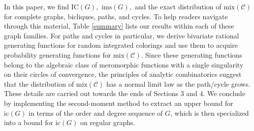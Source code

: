 \documentclass[11pt, reqno]{amsart}
\theoremstyle{definition}
\begin{document}
In this paper, we find $\text{IC}(G),$ $\text{ims}(G),$ and the exact distribution of $\text{mix}(\mathcal{C})$ for complete graphs, bicliques, paths, and cycles. To help readers navigate through this material, Table \ref{summary} lists our results within each of these graph families. For paths and cycles in particular, we derive bivariate rational generating functions for random integrated colorings and use them to acquire probability generating functions for $\text{mix}(\mathcal{C}).$ Since these generating functions belong to the algebraic class of meromorphic functions with a single singularity on their circles of convergence, the principles of analytic combinatorics suggest that the distribution of $\text{mix}(\mathcal{C})$ has a normal limit law as the path/cycle grows. These details are carried out towards the ends of Sections 3 and 4. We conclude by implementing the second-moment method to extract an upper bound for $\text{ic}(G)$ in terms of the order and degree sequence of $G$, which is then specialized into a bound for $\text{ic}(G)$ on regular graphs.
\end{document}
